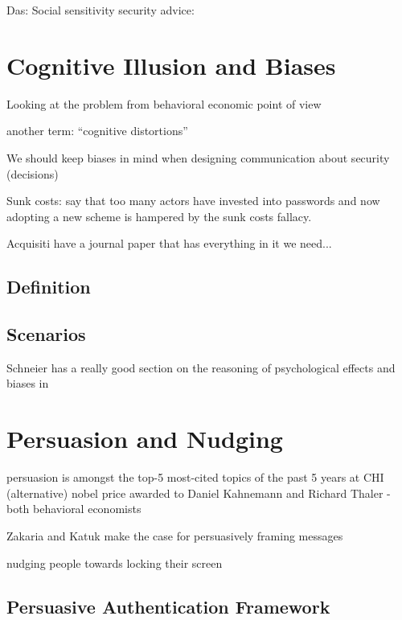 Das: Social sensitivity security advice: \cite{Das2014EffectSocialInfluenceSecuritySensitivity}

\section{Cognitive Illusion and Biases}
Looking at the problem from behavioral economic point of view

another term: ``cognitive distortions''

We should keep biases in mind when designing communication about security (decisions) \cite{Garg2013HeuristicsAndBiases}

Sunk costs: \cite{Herley2012PersistenceOfPasswords} say that too many actors have invested into passwords and now adopting a new scheme is hampered by the sunk costs fallacy.


Acquisiti \etal \cite{Acquisti2017NudgesPrivacySecurity} have a journal paper that has everything in it we need...
	\subsection{Definition}
	\subsection{Scenarios}
	
	
	

Schneier has a really good section on the reasoning of psychological effects and biases in \cite{Schneier2008PsychologySecurity} 
	
	
\section{Persuasion and Nudging}

persuasion is amongst the top-5 most-cited topics of the past 5 years at CHI
(alternative) nobel price awarded to Daniel Kahnemann and Richard Thaler - both behavioral economists

\cite{Zakaria2013DesigningEffectiveSecurityMessages} Zakaria and Katuk make the case for persuasively framing messages


nudging people towards locking their screen \cite{Bruggen2013ModifiyngUnlockingBehavior}

	\subsection{Persuasive Authentication Framework}
